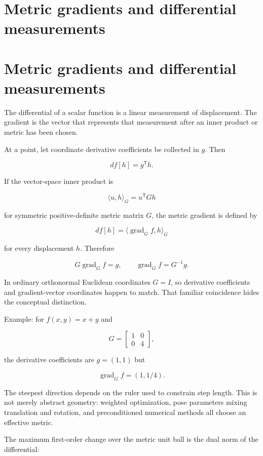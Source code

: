 \hypertarget{appendix-f4acdb1d5563}{}
\section*{Metric gradients and differential measurements}
\section{Metric gradients and differential measurements}\label{appendix-f4acdb1d5563-metric-gradients-and-differential-measurements}

The differential of a scalar function is a linear measurement of displacement. The gradient is the vector that represents that measurement after an inner product or metric has been chosen.

At a point, let coordinate derivative coefficients be collected in \(g\). Then

\[
df[h]=g^{\mathsf T}h.
\]

If the vector-space inner product is

\[
\langle u,h\rangle_G=u^{\mathsf T}Gh
\]

for symmetric positive-definite metric matrix \(G\), the metric gradient is defined by

\[
df[h]=\langle \operatorname{grad}_G f,h\rangle_G
\]

for every displacement \(h\). Therefore

\[
G\operatorname{grad}_G f=g,
\qquad
\operatorname{grad}_G f=G^{-1}g.
\]

In ordinary orthonormal Euclidean coordinates \(G=I\), so derivative coefficients and gradient-vector coordinates happen to match. That familiar coincidence hides the conceptual distinction.

Example: for \(f(x,y)=x+y\) and

\[
G=\begin{bmatrix}1&0\\0&4\end{bmatrix},
\]

the derivative coefficients are \(g=(1,1)\) but

\[
\operatorname{grad}_G f=(1,1/4).
\]

The steepest direction depends on the ruler used to constrain step length. This is not merely abstract geometry: weighted optimization, pose parameters mixing translation and rotation, and preconditioned numerical methods all choose an effective metric.

The maximum first-order change over the metric unit ball is the dual norm of the differential:

